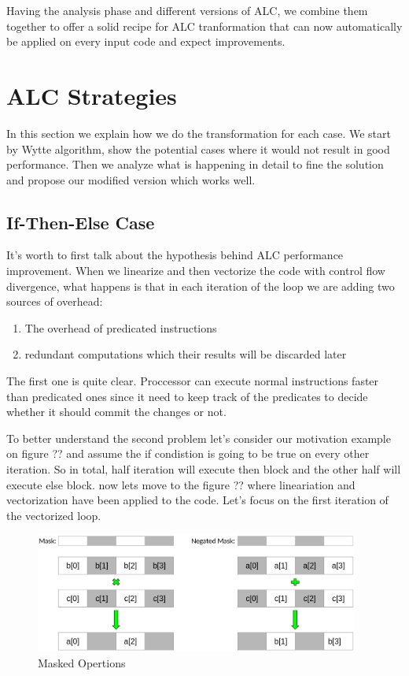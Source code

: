 \documentclass[\main/thesis.tex]{subfiles}
\begin{document}
Having the analysis phase and different versions of ALC, we combine them together to offer a solid recipe for ALC tranformation that can now automatically be applied on every input code and expect improvements.


\section{ALC Strategies}

In this section we explain how we do the transformation for each case. We start by Wytte algorithm, show the potential cases where it would not result in good performance. Then we analyze what is happening in detail to fine the solution and propose our modified version which works well.

\subsection{If-Then-Else Case}
It's worth to first talk about the hypothesis behind ALC performance improvement. When we linearize and then vectorize the code with control flow divergence, what happens is that in each iteration of the loop we are adding two sources of overhead:
\begin{enumerate}
    \item The overhead of predicated instructions
    \item redundant computations which their results will be discarded later 
\end{enumerate}

The first one is quite clear. Proccessor can execute normal instructions faster than predicated ones since it need to keep track of the predicates to decide whether it should commit the changes or not.

To better understand the second problem let's consider our motivation example on figure ?? and assume the if condistion is going to be true on every other iteration. So in total, half iteration will execute then block and the other half will execute else block.
now lets move to the figure ?? where lineariation and vectorization have been applied to the code. Let's focus on the first iteration of the vectorized loop.


\begin{figure}[t!]
    \centering
    \includegraphics[width=0.95\textwidth]{img/masked_operations.png}
    \caption{Masked Opertions}
    \label{fig:masked_multiplication}
\end{figure}
\end{document}
